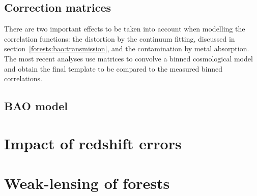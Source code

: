 \subsection{Correction matrices}
\label{forests:bao:matrices}

There are two important effects to be taken into account when modelling 
the \lya correlation functions: the distortion by the continuum fitting, discussed 
in section~\ref{forests:bao:transmission}, and the contamination by metal 
absorption. The most recent analyses use matrices to convolve a binned 
cosmological model and obtain the final template to be compared to 
the measured binned correlations. 




\subsection{BAO model}
\label{forests:bao:model}




\section{Impact of redshift errors}
\label{forests:zerrors}

\section{Weak-lensing of forests}
\label{forests:lensing}



